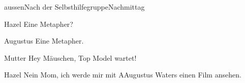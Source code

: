 \documentclass[12pt]{article}
\begin{document}
\begin{scene}[cut to]{aussen}{Nach der Selbsthilfegruppe}{Nachmittag}
        \begin{dialog}[argwöhnisch]{Hazel}
            Eine Metapher?
        \end{dialog}

        \begin{dialog}{Augustus}
            Eine Metapher.
        \end{dialog}


        \begin{dialog}{Mutter}
            Hey Mäuschen, Top Model wartet!
        \end{dialog}

        \begin{dialog}{Hazel}
            Nein Mom, ich werde mir mit A\gls{Augustus} Waters einen Film ansehen.
        \end{dialog}
    \end{scene}
\end{document}
